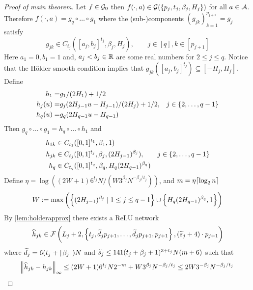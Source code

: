 \begin{proof}[Proof of main theorem]
  Let $f \in \mathcal{G}_0$ then $f(\cdot, a) \in
  \mathcal{G}(\{p_j, t_j, \beta_j, H_j\})$ for all $a \in \mathcal{A}$.
  Therefore $f(\cdot, a) = g_q \circ \dots \circ g_1$ where
  the (sub-)components $(g_{jk})_{k=1}^{p_{j+1}} = g_j$ satisfy
  \begin{equation}
    g_{jk} \in C_{t_j}([a_j, b_j]^{t_j}, \beta_j, H_j)
    , \qquad j \in [q], k \in [p_{j+1}]
  \end{equation}
  Here $a_1 = 0, b_1=1$ and,
  $a_j < b_j \in \mathbb{R}$ are some real numbers for $2 \leq j \leq q$.
  Notice that the Hölder smooth condition implies that
  $g_{jk}([a_j, b_j]^{t_j}) \subseteq [-H_j, H_j]$.
  Define
  \begin{align}
    h_1 = & g_1/(2H_1) + 1/2 \notag
    \\ h_j(u) = & g_j(2H_{j-1} u - H_{j-1})/(2H_j) + 1/2,
    & j \in \{2, \dots, q-1\} \notag
    \\ h_q(u) = & g_q(2H_{q-1}u - H_{q-1})
  \end{align}
  Then $g_q \circ \dots \circ g_1 = h_q \circ \dots \circ h_1$ and
  \begin{align}
    h_{1k} \in &\; C_{t_1}([0,1]^{t_1}, \beta_1, 1) \notag
    \\ h_{jk} \in &\; C_{t_j}([0,1]^{t_j}, \beta_j, (2H_{j-1})^{\beta_j}),
    & j \in \{2, \dots, q-1\} \notag
    \\ h_q \in &\; C_{t_q}([0,1]^{t_q}, \beta_q, H_q(2H_{q-1})^{\beta_q})
  \end{align}
  Define %
  $\eta = \log\left((2W + 1) 6^{t_j} N / (W 3^{\beta_j} N^{-\beta_j/t_j}) \right)$,
  and $m = \eta \lceil\log_2 n\rceil$ 
  \begin{equation}
    W \vcentcolon= \max \left( \left\{ (2 H_{j-1})^{\beta_j} \mid 1\leq j\leq q-1 \right\}
    \cup \left\{ H_q(2H_{q-1})^{\beta_q}, 1\right\} \right)
  \end{equation}
  By \cref{lem:holderapprox} there exists a ReLU network
  \begin{equation}
    \widehat{h}_{jk} \in \mathcal{F} \left( L_j + 2, \left\{ t_j, \widetilde{d}_j p_{j+1}, \dots,
    \widetilde{d}_j p_{j+1}, p_{j+1} \right\}, (\widetilde{s}_j + 4) \cdot p_{j+1} \right)
  \end{equation}
  where $\widetilde{d}_j = 6(t_j + \lceil\beta_j\rceil)N$ and
  $\widetilde{s}_j \leq 141 (t_j + \beta_j + 1)^{3 + t_j} N (m + 6)$
  such that
  \begin{equation}
    \norm{\wh{h}_{jk} - h_{jk}}_\infty \leq (2 W + 1) 6^{t_j} N 2^{-m}
    + W 3^{\beta_j} N^{-\beta_j/t_j} \leq 2 W 3^{-\beta_j} N^{-\beta_j/t_j}
    \label{eq:hhatbound}

\end{equation}
\end{proof}
